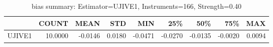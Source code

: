 \begin{table}[ht]
\centering
\caption{bias summary: Estimator=UJIVE1, Instruments=166, Strength=0.40}
\begin{tabular}{lrrrrrrrr}
\toprule
 & COUNT & MEAN & STD & MIN & 25\% & 50\% & 75\% & MAX \\
\midrule
UJIVE1 & 10.0000 & -0.0146 & 0.0180 & -0.0471 & -0.0270 & -0.0135 & -0.0020 & 0.0094 \\
\bottomrule
\end{tabular}
\end{table}
